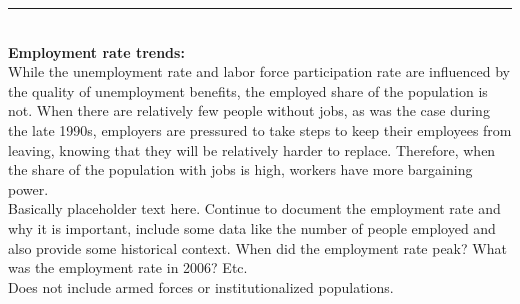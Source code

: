 \documentclass{report}
\newcommand{\dateaxisticks}{
		axis line style={draw=none},
		max space between ticks=38,	 
		xmin={1997-01-01},
		xtick={
			{1995-01-01},
			{2000-01-01},
			{2005-01-01},
			{2010-01-01},
			{2015-01-01}},
	    minor xtick={
	    	{1994-01-01}, {1996-01-01}, {1997-01-01}, {1998-01-01}, {1999-01-01},
			{2001-01-01}, {2002-01-01}, {2003-01-01}, {2004-01-01}, 
	    	{2006-01-01}, {2007-01-01}, {2008-01-01}, {2009-01-01},
	      	{2011-01-01}, {2012-01-01}, {2013-01-01}, {2014-01-01},
	      	{2016-01-01}, {2017-01-01}, {2018-01-01}, {2019-01-01}},
	    enlarge y limits={0.08},
	    enlarge x limits={0.12},}
\newcommand{\lastpt}[1]{node[circle, 
		minimum size=3pt, inner sep=0pt, draw, fill, pos=1](#1){};}
\begin{document}
\noindent \begin{minipage}[t]{0.475\textwidth}

\noindent \textcolor{blue}{\rule[-6pt]{90mm}{24pt}}
		\vspace{-9mm}
		
		\hspace{1mm} \textcolor{white}{}
\vspace{1.1mm}

\hspace{0.8mm} 
\vspace{4mm}\\
\textbf{Employment rate trends:}
\vspace{2mm}\\
While the unemployment rate and labor force participation rate are influenced by the quality of unemployment benefits, the employed share of the population is not. When there are relatively few people without jobs, as was the case during the late 1990s, employers are pressured to take steps to keep their employees from leaving, knowing that they will be relatively harder to replace. Therefore, when the share of the population with jobs is high, workers have more bargaining power. \\

Basically placeholder text here. Continue to document the employment rate and why it is important, include some data like the number of people employed and also provide some historical context. When did the employment rate peak? What was the employment rate in 2006? Etc.\\

Does not include armed forces or institutionalized populations.
\end{minipage}\hfill
\end{document}
